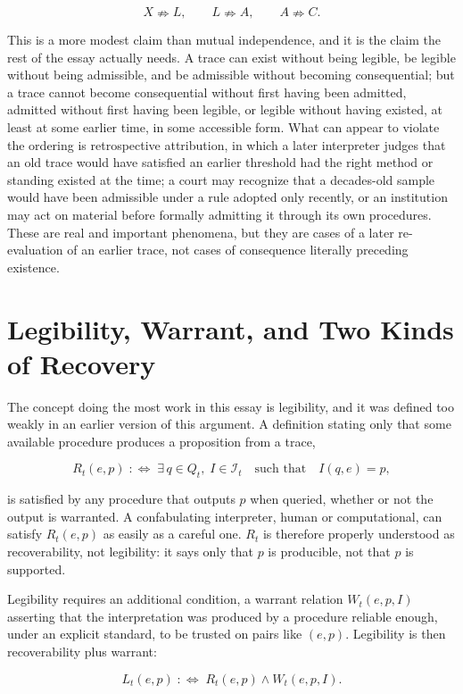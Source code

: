 \documentclass[11pt]{article}
\begin{document}
\[
X \nRightarrow L, \qquad L \nRightarrow A, \qquad A \nRightarrow C.
\]

This is a more modest claim than mutual independence, and it is the claim the rest of the essay actually needs. A trace can exist without being legible, be legible without being admissible, and be admissible without becoming consequential; but a trace cannot become consequential without first having been admitted, admitted without first having been legible, or legible without having existed, at least at some earlier time, in some accessible form. What can appear to violate the ordering is retrospective attribution, in which a later interpreter judges that an old trace would have satisfied an earlier threshold had the right method or standing existed at the time; a court may recognize that a decades-old sample would have been admissible under a rule adopted only recently, or an institution may act on material before formally admitting it through its own procedures. These are real and important phenomena, but they are cases of a later re-evaluation of an earlier trace, not cases of consequence literally preceding existence.

\section{Legibility, Warrant, and Two Kinds of Recovery}

The concept doing the most work in this essay is legibility, and it was defined too weakly in an earlier version of this argument. A definition stating only that some available procedure produces a proposition from a trace,

\[
R_t(e,p) \;:\Leftrightarrow\; \exists\, q \in Q_t,\; I \in \mathcal I_t \quad \text{such that} \quad I(q,e) = p,
\]

is satisfied by any procedure that outputs $p$ when queried, whether or not the output is warranted. A confabulating interpreter, human or computational, can satisfy $R_t(e,p)$ as easily as a careful one. $R_t$ is therefore properly understood as recoverability, not legibility: it says only that $p$ is producible, not that $p$ is supported.

Legibility requires an additional condition, a warrant relation $W_t(e,p,I)$ asserting that the interpretation was produced by a procedure reliable enough, under an explicit standard, to be trusted on pairs like $(e,p)$. Legibility is then recoverability plus warrant:

\[
L_t(e,p) \;:\Leftrightarrow\; R_t(e,p) \land W_t(e,p,I).
\]
\end{document}
